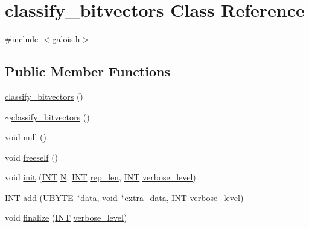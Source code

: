 \hypertarget{classclassify__bitvectors}{}\section{classify\+\_\+bitvectors Class Reference}
\label{classclassify__bitvectors}


{\ttfamily \#include $<$galois.\+h$>$}

\subsection*{Public Member Functions}
\begin{DoxyCompactItemize}
\item 
\mbox{\hyperlink{classclassify__bitvectors_a0586c94ccd360dbe71e2c97748084523}{classify\+\_\+bitvectors}} ()
\item 
\mbox{\hyperlink{classclassify__bitvectors_a272114ab3d1724a5dd36945815df5414}{$\sim$classify\+\_\+bitvectors}} ()
\item 
void \mbox{\hyperlink{classclassify__bitvectors_a2f5464d3b9c38e8980f1bccb6fd90324}{null}} ()
\item 
void \mbox{\hyperlink{classclassify__bitvectors_abfe5cfa8e3d64cda768e5181e19fbf3c}{freeself}} ()
\item 
void \mbox{\hyperlink{classclassify__bitvectors_aaae32847cc6f4de57361bf9a1eaa073f}{init}} (\mbox{\hyperlink{galois_8h_a09fddde158a3a20bd2dcadb609de11dc}{I\+NT}} \mbox{\hyperlink{classclassify__bitvectors_afa39172c4d729b0a495190068905c365}{N}}, \mbox{\hyperlink{galois_8h_a09fddde158a3a20bd2dcadb609de11dc}{I\+NT}} \mbox{\hyperlink{classclassify__bitvectors_addc3d5aa12cad0945e37a606e5a4a770}{rep\+\_\+len}}, \mbox{\hyperlink{galois_8h_a09fddde158a3a20bd2dcadb609de11dc}{I\+NT}} \mbox{\hyperlink{simeon_8_c_a818073fbcc2f439e7c56952f67386122}{verbose\+\_\+level}})
\item 
\mbox{\hyperlink{galois_8h_a09fddde158a3a20bd2dcadb609de11dc}{I\+NT}} \mbox{\hyperlink{classclassify__bitvectors_ade2600c6a1b57b9478cf3323fbd44de7}{add}} (\mbox{\hyperlink{galois_8h_a122c4acf389c050379f00341fdcd5812}{U\+B\+Y\+TE}} $\ast$data, void $\ast$extra\+\_\+data, \mbox{\hyperlink{galois_8h_a09fddde158a3a20bd2dcadb609de11dc}{I\+NT}} \mbox{\hyperlink{simeon_8_c_a818073fbcc2f439e7c56952f67386122}{verbose\+\_\+level}})
\item 
void \mbox{\hyperlink{classclassify__bitvectors_adf8a59f998312b4fcc60361e87bcc6cb}{finalize}} (\mbox{\hyperlink{galois_8h_a09fddde158a3a20bd2dcadb609de11dc}{I\+NT}} \mbox{\hyperlink{simeon_8_c_a818073fbcc2f439e7c56952f67386122}{verbose\+\_\+level}})

\end{DoxyCompactItemize}
